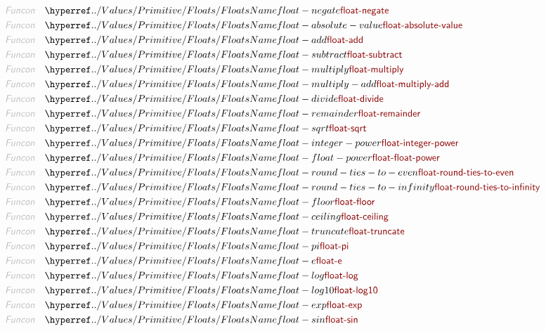 \begin{align*}
  \KEY{Funcon} \quad & \NAMEHYPER{../Values/Primitive}{Floats}{float-negate} \\
  \KEY{Funcon} \quad & \NAMEHYPER{../Values/Primitive}{Floats}{float-absolute-value} \\
  \KEY{Funcon} \quad & \NAMEHYPER{../Values/Primitive}{Floats}{float-add} \\
  \KEY{Funcon} \quad & \NAMEHYPER{../Values/Primitive}{Floats}{float-subtract} \\
  \KEY{Funcon} \quad & \NAMEHYPER{../Values/Primitive}{Floats}{float-multiply} \\
  \KEY{Funcon} \quad & \NAMEHYPER{../Values/Primitive}{Floats}{float-multiply-add} \\
  \KEY{Funcon} \quad & \NAMEHYPER{../Values/Primitive}{Floats}{float-divide} \\
  \KEY{Funcon} \quad & \NAMEHYPER{../Values/Primitive}{Floats}{float-remainder} \\
  \KEY{Funcon} \quad & \NAMEHYPER{../Values/Primitive}{Floats}{float-sqrt} \\
  \KEY{Funcon} \quad & \NAMEHYPER{../Values/Primitive}{Floats}{float-integer-power} \\
  \KEY{Funcon} \quad & \NAMEHYPER{../Values/Primitive}{Floats}{float-float-power} \\
  \KEY{Funcon} \quad & \NAMEHYPER{../Values/Primitive}{Floats}{float-round-ties-to-even} \\
  \KEY{Funcon} \quad & \NAMEHYPER{../Values/Primitive}{Floats}{float-round-ties-to-infinity} \\
  \KEY{Funcon} \quad & \NAMEHYPER{../Values/Primitive}{Floats}{float-floor} \\
  \KEY{Funcon} \quad & \NAMEHYPER{../Values/Primitive}{Floats}{float-ceiling} \\
  \KEY{Funcon} \quad & \NAMEHYPER{../Values/Primitive}{Floats}{float-truncate} \\
  \KEY{Funcon} \quad & \NAMEHYPER{../Values/Primitive}{Floats}{float-pi} \\
  \KEY{Funcon} \quad & \NAMEHYPER{../Values/Primitive}{Floats}{float-e} \\
  \KEY{Funcon} \quad & \NAMEHYPER{../Values/Primitive}{Floats}{float-log} \\
  \KEY{Funcon} \quad & \NAMEHYPER{../Values/Primitive}{Floats}{float-log10} \\
  \KEY{Funcon} \quad & \NAMEHYPER{../Values/Primitive}{Floats}{float-exp} \\
  \KEY{Funcon} \quad & \NAMEHYPER{../Values/Primitive}{Floats}{float-sin} \\

\end{align*}

